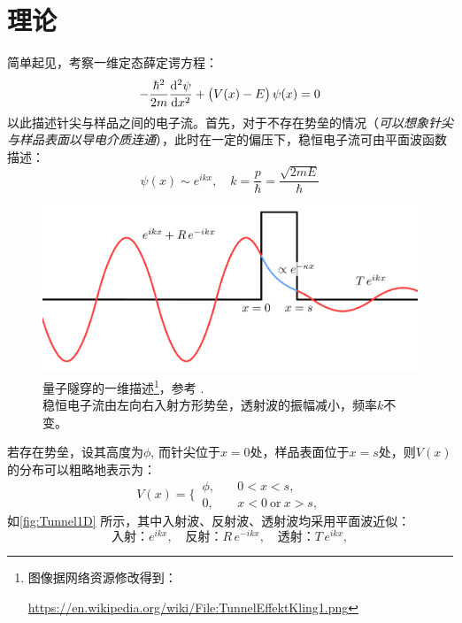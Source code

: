 \documentclass[aps,pre,12pt,preprint,%
	onecolumn,showpacs,showkeys,nofootinbib]{revtex4-1}
\begin{document}
\section{理论}
	简单起见，考察一维定态薛定谔方程：
	\begin{equation}
		- \frac{\hbar^2}{2m} \dv[2]{\psi}{x}
			+ \pqty\big{V(x) - E}\,\psi(x) = 0
	\end{equation}
	以此描述针尖与样品之间的电子流。首先，对于不存在势垒的情况（\textit{可以想象针尖与样品表面以导电介质连通}），此时在一定的偏压下，稳恒电子流可由平面波函数描述：
	\begin{equation}
		\psi(x) \sim e^{ikx},\quad
		k = \frac{p}{\hbar} = \frac{\sqrt{2mE}}{\hbar}
	\end{equation}
	
	\begin{figure}[!h]
	\centering
	\vspace{-0.5\baselineskip}
	\includegraphics[width=.8\linewidth]{TunnelEffect.png}
	\caption[量子隧穿的一维描述]{量子隧穿的一维描述\footnote{%
			图像据网络资源修改得到：\par
			\noindent%
			\url{https://en.wikipedia.org/wiki/File:TunnelEffektKling1.png}%
		}，参考 \cite{griffiths2016introduction}. \\
		稳恒电子流由左向右入射方形势垒，透射波的振幅减小，频率$k$不变。
		\vspace{.5ex}
	}
	\label{fig:Tunnel1D}
	\end{figure}
	
	\vspace{1ex}
	若存在势垒，设其高度为$\phi$, 而针尖位于$x = 0$处，样品表面位于$x = s$处，则$V(x)$的分布可以粗略地表示为：
	\begin{equation}
		V(x) = \Bigg\lbrace\,
		\begin{aligned}
			\phi, \quad& 0 < x < s,\\
			0, \quad& x < 0 \ \textrm{or}\  x > s, 
		\end{aligned}
	\end{equation}
	如\autoref{fig:Tunnel1D} 所示，其中入射波、反射波、透射波均采用平面波近似：
	\begin{equation}
		\textit{入射：} e^{ikx},\quad
		\textit{反射：} R\,e^{-ikx},\quad
		\textit{透射：} T\,e^{ikx},
	\end{equation}
	
\end{document}
